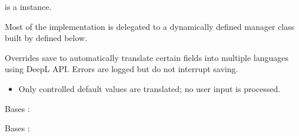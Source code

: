 \documentclass[letterpaper,10pt,french]{sphinxmanual}
\begin{document}
\begin{fulllineitems}
\begin{fulllineitems}
\sphinxAtStartPar
{} is a  instance.

\sphinxAtStartPar
Most of the implementation is delegated to a dynamically defined manager
class built by  defined below.

\end{fulllineitems}


\begin{fulllineitems}
\label{\detokenize{index:core.models.FoodInfo.save}}
\pysigstartsignatures
\pysiglinewithargsret
{}
{\sphinxparamcomma {}}
{}
\pysigstopsignatures
\sphinxAtStartPar
Overrides save to automatically translate certain fields into multiple languages
using DeepL API. Errors are logged but do not interrupt saving.
\begin{description}
\begin{itemize}
\item {} 
\sphinxAtStartPar
Only controlled default values are translated; no user input is processed.

\end{itemize}

\end{description}

\end{fulllineitems}


\begin{fulllineitems}
\label{\detokenize{index:core.models.FoodInfo.DoesNotExist}}
\pysigstartsignatures
\pysigline
{}
\pysigstopsignatures
\sphinxAtStartPar
Bases : 

\end{fulllineitems}


\begin{fulllineitems}
\label{\detokenize{index:core.models.FoodInfo.MultipleObjectsReturned}}
\pysigstartsignatures
\pysigline
{}
\pysigstopsignatures
\sphinxAtStartPar
Bases : 


\end{fulllineitems}
\end{fulllineitems}
\end{document}
